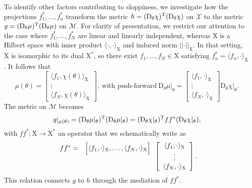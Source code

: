 \documentclass{article}
\newcommand{\D}{\mathrm{D}}
\newcommand{\norm}[1]{\vert\vert#1\vert\vert}
\newcommand{\p}{\theta}
\newcommand{\fmr}{\chi}
\newcommand{\fmm}{\mathcal{X}}
\newcommand{\omr}{\mu}
\newcommand{\omm}{\mathcal{M}}
\newcommand{\fms}{\mathrm{X}}
\begin{document}
To identify other factors contributing to sloppiness,
we investigate how the projections $f^*_1,\ldots,f^*_n$
transform the metric $h = (\D_\p\fmr)^{\rm T}(\D_\p\fmr)$ on $\fmm$
to the metric $g = (\D_\p\omr)^{\rm T}(\D_\p\omr)$ on $\omm$.
For clarity of presentation,
we restrict our attention to the case where
$f^*_1,\ldots,f^*_N$ are linear and linearly independent,
whereas $\fms$ is a Hilbert space
with inner product $\langle\cdot,\cdot\rangle_\fms$
and induced norm $\norm{\cdot}_\fms$.
In that setting,
$\fms$ is isomorphic to its dual $\fms^*$,
so there exist $f_1,\ldots,f_N \in \fms$
satisfying $f^*_n = \langle f_n,\cdot \rangle_\fms$.
It follows that
%
\[
 \omr(\p)
=
\left[\begin{array}{c}
 \langle f_1,\fmr(\p) \rangle_\fms
\\
\vdots
\\
 \langle f_N,\fmr(\p) \rangle_\fms
\end{array}\right] ,
\ \mbox{with push-forward} \
 \D_\p\omr\vert_\p
=
\left[\begin{array}{c}
 \langle f_1,\cdot\rangle_\fms
\\
\vdots
\\
 \langle f_N,\cdot \rangle_\fms
\end{array}\right]
 \D_\p\fmr\vert_\p .
\]
%
The metric on $\omm$ becomes
%
\[
 g\vert_{\omr(\p)}
=
 (\D_\p\omr\vert_\p)^{\rm T}
 (\D_\p\omr\vert_\p)
=
 (\D_\p\fmr\vert_\p)^{\rm T}
 f f^*
 (\D_\p\fmr\vert_\p) ,
\] 
%
with $f f^* : \fms \to \fms^*$ an operator
that we schematically write as
%
\[
\begin{array}{c}
 f f^*
=
\\
\vspace*{4mm}
\end{array}
\begin{array}{c}
\Big[
 \langle f_1,\cdot\rangle_\fms
,
 \ldots
,
 \langle f_N,\cdot\rangle_\fms
\Big]
\\
\vspace*{4mm}
\end{array}
%
\left[\begin{array}{c}
 \langle f_1,\cdot\rangle_\fms
\\
 \vdots
\\
 \langle f_N,\cdot\rangle_\fms
\end{array}\right] .
\]
%
This relation connects $g$ to $h$
through the mediation of $f f^*$.\\
\end{document}
